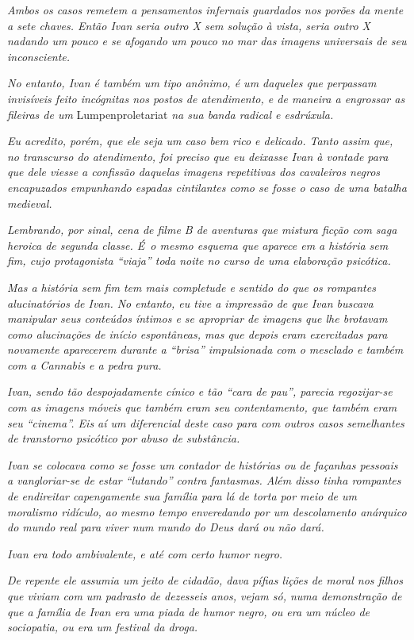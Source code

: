 \emph{Ambos os casos remetem a pensamentos infernais guardados nos
porões da mente a sete chaves. Então Ivan seria outro X sem solução à
vista, seria outro X nadando um pouco e se afogando um pouco no mar das
imagens universais de seu inconsciente.}

\emph{No entanto, Ivan é também um tipo anônimo, é um daqueles que
perpassam invisíveis feito incógnitas nos postos de atendimento, e de
maneira a engrossar as fileiras de um} Lumpenproletariat \emph{na sua banda
radical e esdrúxula.}

\emph{Eu acredito, porém, que ele seja um caso bem rico e delicado.
Tanto assim que, no transcurso do atendimento, foi preciso que eu
deixasse Ivan à vontade para que dele viesse a confissão daquelas
imagens repetitivas dos cavaleiros negros encapuzados empunhando espadas
cintilantes como se fosse o caso de uma batalha medieval.}

\emph{Lembrando, por sinal, cena de filme B de aventuras que mistura
ficção com saga heroica de segunda classe. É~o mesmo esquema que aparece
em a história sem fim, cujo protagonista ``viaja'' toda noite no curso de
uma elaboração psicótica.}

\emph{Mas a história sem fim tem mais completude e sentido do que os
rompantes alucinatórios de Ivan. No entanto, eu tive a impressão de que
Ivan buscava manipular seus conteúdos íntimos e se apropriar de imagens
que lhe brotavam como alucinações de início espontâneas, mas que depois
eram exercitadas para novamente aparecerem durante a ``brisa''
impulsionada com o mesclado e também com a Cannabis e a pedra pura.}

\emph{Ivan, sendo tão despojadamente cínico e tão ``cara de pau'',
parecia regozijar-se com as imagens móveis que também eram seu
contentamento, que também eram seu ``cinema''. Eis aí um diferencial
deste caso para com outros casos semelhantes de transtorno psicótico por
abuso de substância.}

\emph{Ivan se colocava como se fosse um contador de histórias ou de
façanhas pessoais a vangloriar-se de estar ``lutando'' contra fantasmas.
Além disso tinha rompantes de endireitar capengamente sua família para
lá de torta por meio de um moralismo ridículo, ao mesmo tempo
enveredando por um descolamento anárquico do mundo real para viver num
mundo do Deus dará ou não dará.}

\emph{Ivan era todo ambivalente, e até com certo humor negro.}

\emph{De repente ele assumia um jeito de cidadão, dava pífias lições de
moral nos filhos que viviam com um padrasto de dezesseis anos, vejam só,
numa demonstração de que a família de Ivan era uma piada de humor negro,
ou era um núcleo de sociopatia, ou era um festival da droga.}


